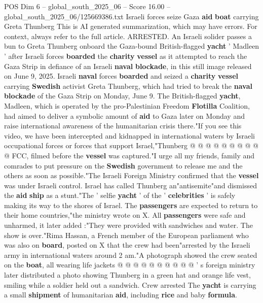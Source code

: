 \begin{textsample}{POS Dim 6 – global\_south\_2025\_06 – Score 16.00 – global\_south\_2025\_06/125669386.txt}  \label{ex:f6_pos_006}
Israeli forces seize Gaza \textbf{aid} \textbf{boat} carrying Greta Thunberg This is AI generated summarization, which may have errors.
For context, always refer to the full article.
ARRESTED.
An Israeli solider passes a bun to Greta Thunberg onboard the Gaza-bound British-flagged \textbf{yacht} ' Madleen ' after Israeli forces \textbf{boarded} the \textbf{charity} \textbf{vessel} as it attempted to reach the Gaza Strip in defiance of an Israeli \textbf{naval} \textbf{blockade}, in this still image released on June 9, 2025.
Israeli \textbf{naval} forces \textbf{boarded} and seized a \textbf{charity} \textbf{vessel} carrying \textbf{Swedish} activist Greta Thunberg, which had tried to break the \textbf{naval} \textbf{blockade} of the Gaza Strip on Monday, June 9.
The British-flagged \textbf{yacht}, Madleen, which is operated by the pro-Palestinian Freedom \textbf{Flotilla} Coalition, had aimed to deliver a symbolic amount of \textbf{aid} to Gaza later on Monday and raise international awareness of the humanitarian crisis there."If you see this video, we have been intercepted and kidnapped in international waters by Israeli occupational forces or forces that support Israel,"Thunberg @ @ @ @ @ @ @ @ @ @ FCC, filmed before the \textbf{vessel} was captured."I urge all my friends, family and comrades to put pressure on the \textbf{Swedish} government to release me and the others as soon as possible."The Israeli Foreign Ministry confirmed that the \textbf{vessel} was under Israeli control.
Israel has called Thunberg an"antisemite"and dismissed the \textbf{aid} \textbf{ship} as a stunt."The ' selfie \textbf{yacht} ' of the ' \textbf{celebrities} ' is safely making its way to the shores of Israel.
The \textbf{passengers} are expected to return to their home countries,"the ministry wrote on X.
All \textbf{passengers} were safe and unharmed, it later added :"They were provided with sandwiches and water.
The show is over."Rima Hassan, a French member of the European parliament who was also on \textbf{board}, posted on X that the crew had been"arrested by the Israeli army in international waters around 2 am."A photograph showed the crew seated on the \textbf{boat}, all wearing life jackets @ @ @ @ @ @ @ @ @ @ ' s foreign ministry later distributed a photo showing Thunberg in a green hat and orange life vest, smiling while a soldier held out a sandwich.
Crew arrested The \textbf{yacht} is carrying a small \textbf{shipment} of humanitarian \textbf{aid}, including \textbf{rice} and baby \textbf{formula}.

\end{textsample}

